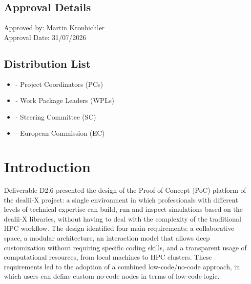 \documentclass[a4paper,12pt]{article}
\begin{document}
\newpage

\begin{documentControl}
\end{documentControl}

\subsection*{{Approval Details}}
Approved by: Martin Kronbichler \\
Approval Date: 31/07/2026

\subsection*{{Distribution List}}
\begin{itemize}
    \item [] - Project Coordinators (PCs)
    \item [] - Work Package Leaders (WPLs)
    \item [] - Steering Committee (SC)
    \item [] - European Commission (EC)
\end{itemize}

\vspace*{2cm}

\disclaimer

\newpage

\tableofcontents %

\newpage


\section{\textcolor{EUblue}{Introduction}}

Deliverable D2.6 presented the design of the Proof of Concept (PoC) platform
of the dealii-X project: a single environment in which professionals with
different levels of technical expertise can build, run and inspect
simulations based on the dealii-X libraries, without having to deal with the
complexity of the traditional HPC workflow. The design identified four main
requirements: a collaborative space, a modular architecture, an interaction
model that allows deep customization without requiring specific coding
skills, and a transparent usage of computational resources, from local
machines to HPC clusters. These requirements led to the adoption of a
combined low-code/no-code approach, in which users can define custom no-code
nodes in terms of low-code logic.
\end{document}
